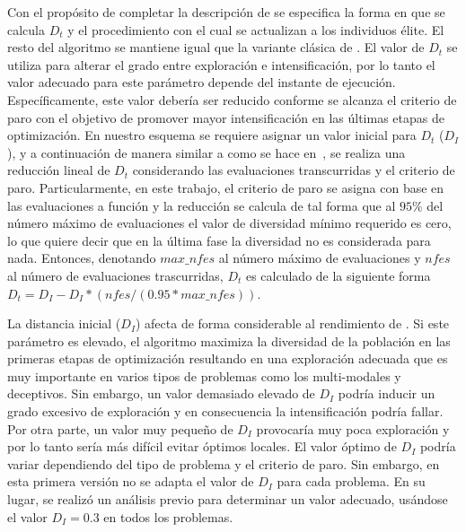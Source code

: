 Con el propósito de completar la descripción de \DEEDM{} se especifica la forma en que se calcula $D_t$ y el procedimiento con el cual se actualizan a los individuos élite.
%
El resto del algoritmo se mantiene igual que la variante clásica de \DE{}.
%
El valor de $D_t$ se utiliza para alterar el grado entre exploración e intensificación, por lo tanto el valor adecuado para este parámetro depende del
instante de ejecución.
%
Específicamente, este valor debería ser reducido conforme se alcanza el criterio de paro con el objetivo de promover mayor intensificación 
en las últimas etapas de optimización.
%
En nuestro esquema se requiere asignar un valor inicial para $D_t$ ($D_I$), y a continuación de manera similar a como se hace en~\cite{segura2016novel}, 
se realiza una reducción lineal de $D_t$ considerando las evaluaciones transcurridas y el criterio de paro.
%
Particularmente, en este trabajo, el criterio de paro se asigna con base en las evaluaciones a función
y la reducción se calcula de tal forma que al $95\%$ del número máximo de evaluaciones el valor de diversidad mínimo requerido es cero,
lo que quiere decir que en la última fase la diversidad no es considerada para nada.
%
Entonces, denotando $max\_nfes$ al número máximo de evaluaciones y $nfes$ al número de evaluaciones trascurridas, $D_t$ es calculado de la siguiente 
forma $D_t=D_I - D_I *(nfes/(0.95*max\_nfes))$.

La distancia inicial ($D_I$) afecta de forma considerable al rendimiento de \DEEDM{}.
%
Si este parámetro es elevado, el algoritmo maximiza la diversidad de la población en las primeras etapas de optimización resultando en una exploración adecuada 
que es muy importante en varios tipos de problemas como los multi-modales y deceptivos.
%
Sin embargo, un valor demasiado elevado de $D_I$ podría inducir un grado excesivo de exploración y en consecuencia la intensificación podría fallar.
%
Por otra parte, un valor muy pequeño de $D_I$ provocaría muy poca exploración y por lo tanto sería más difícil evitar óptimos locales.
%
El valor óptimo de $D_I$ podría variar dependiendo del tipo de problema y el criterio de paro. %
%
Sin embargo, en esta primera versión no se adapta el valor de $D_I$ para cada problema.
%
En su lugar, se realizó un análisis previo para determinar un valor adecuado, usándose el valor $D_I = 0.3$ en todos los 
problemas.

